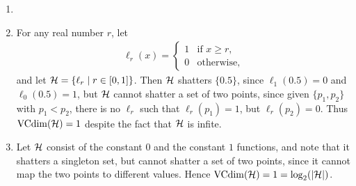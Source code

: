 \begin{ex}
  \begin{enumerate}
    \item[]
    \item For any real number $r$, let
          \begin{align*}
            \ell_r(x)=\begin{cases}
              1 & \text{if $x \geq r$}, \\
              0 & \text{otherwise},
            \end{cases}
          \end{align*}
          and let $\mathcal{H}=\{\ell_r \mid r\in [0, 1] \}$. Then $\mathcal{H}$ shatters $\{0.5\}$, since $\ell_1(0.5)=0$ and $\ell_0(0.5)=1$,
          but $\mathcal{H}$ cannot shatter a set of two points, since
          given $\{p_1, p_2\}$ with $p_1 < p_2$, there is no $\ell_r$ such that $\ell_r(p_1) = 1$, but $\ell_r(p_2)=0$.
          Thus $\operatorname*{VCdim}(\mathcal{H})=1$ despite the fact that $\mathcal{H}$ is infite.
    \item Let $\mathcal{H}$ consist of the constant $0$ and the constant $1$ functions, and note that it
          shatters a singleton set, but cannot shatter a set of two points, since it cannot map the two
          points to different values. Hence $\operatorname*{VCdim}(\mathcal{H})=1=\log_2(|\mathcal{H}|)$.
  \end{enumerate}
\end{ex}

\begin{ex}
\end{ex}

\begin{ex}
\end{ex}

\begin{ex}
\end{ex}

\begin{ex}
\end{ex}

\begin{ex}
\end{ex}